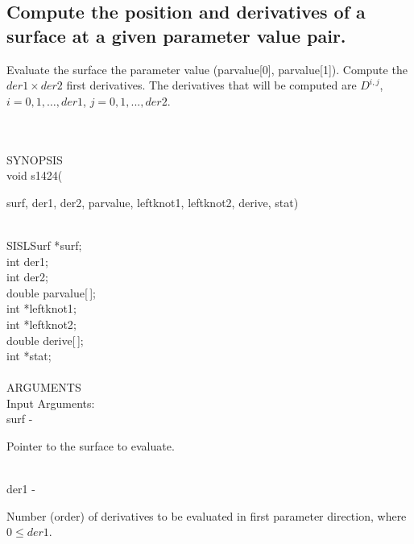 \subsection{Compute the position and derivatives of a surface at a given
parameter value pair.}
\begin{minipg1}
  Evaluate the surface the parameter value ({\fov parvalue}[0],
  {\fov parvalue}[1]).
  Compute the $der1\times der2$ first derivatives.
  The derivatives that will be computed are $D^{i,j}$,
  $i=0,1,\ldots,der1$, $j=0,1,...,der2$.
\end{minipg1}\\ \\
SYNOPSIS\\
        \>void s1424(\begin{minipg3}
          {\fov surf}, {\fov der1}, {\fov der2}, {\fov parvalue}, {\fov leftknot1}, {\fov leftknot2}, {\fov derive}, {\fov stat})
        \end{minipg3}\\[0.3ex]
        \>\>    SISLSurf        \>      *{\fov surf};\\
        \>\>    int     \>      {\fov der1};\\
        \>\>    int     \>      {\fov der2};\\
        \>\>    double  \>      {\fov parvalue}[\,];\\
        \>\>    int     \>      *{\fov leftknot1};\\
        \>\>    int     \>      *{\fov leftknot2};\\
        \>\>    double  \>      {\fov derive}[\,];\\
        \>\>    int     \>      *{\fov stat};\\
\\
ARGUMENTS\\
        \>Input Arguments:\\
        \>\>    {\fov surf}\> - \>      \begin{minipg2}
                                Pointer to the surface to evaluate.
                                \end{minipg2}\\
        \>\>    {\fov der1}\> - \>      \begin{minipg2}
                                Number (order) of derivatives to be
                                evaluated in
                                first parameter direction, where $0\leq der1$.
                                \end{minipg2}\\[0.8ex]

